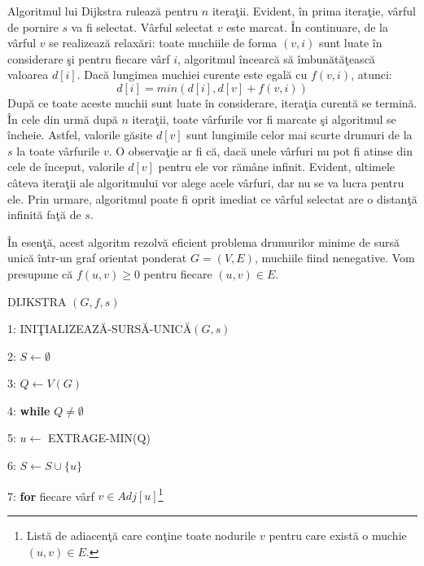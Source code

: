 \documentclass[11pt,a4paper]{report}
\begin{document}
    
    Algoritmul lui Dijkstra ruleaz\u a pentru $n$ itera\c tii. Evident, \^ in  prima itera\c tie, v\^ arful de pornire $s$ va fi selectat. V\^ arful selectat $v$ este marcat. \^ In continuare, de la v\^ arful $v$ se realizeaz\u a relax\u ari: toate muchiile de forma $(v,i)$ sunt luate \^ in considerare \c si pentru fiecare v\^ arf $i$, algoritmul \^ incearc\u a s\u a \^ imbun\u at\u a\c teasc\u a valoarea $d[i]$. Dac\u a lungimea muchiei curente este egal\u a cu $f(v,i)$, atunci:
        \begin{equation*}
    d[i]=min(d[i],d[v]+f(v,i))
    \end{equation*}  
    Dup\u a ce toate aceste muchii sunt luate \^ in considerare, itera\c tia curent\u a se termin\u a. \^ In cele din urm\u a dup\u a $n$ itera\c tii, toate v\^ arfurile vor fi marcate \c si algoritmul se \^ incheie. Astfel, valorile g\u asite $d[v]$ sunt lungimile celor mai scurte drumuri de la $s$ la toate v\^ arfurile $v$.  
    O observa\c tie ar fi c\u a, dac\u a unele v\^ arfuri nu pot fi atinse din cele de \^ inceput, valorile $d[v]$ pentru ele vor r\u am\^ ane infinit. Evident, ultimele c\^ ateva itera\c tii ale algoritmului vor alege acele v\^ arfuri, dar nu se va lucra pentru ele. Prin urmare, algoritmul poate fi oprit imediat ce v\^ arful selectat are o distan\c t\u a infinit\u a fa\c t\u a de $s$. 
    
    \^ In esen\c t\u a, acest algoritm rezolv\u a eficient problema drumurilor minime de surs\u a unic\u a \^ intr-un graf orientat ponderat $G=(V,E)$, muchiile fiind nenegative. Vom presupune c\u a $f(u,v)\ge 0$ pentru fiecare $(u,v)\in E$.
    
    
    \vspace{0.3cm}
    DIJKSTRA $(G,f,s)$
    
    \vspace{0.1cm}
    1: INI\c TIALIZEAZ\u A-SURS\u A-UNIC\u A$(G,s)$
    
    2: $S\longleftarrow \emptyset$  
    
    3: $Q\longleftarrow V(G)$
    
    4: \textbf{while} $Q\ne \emptyset$ 
    
    5:\hspace{0.6cm} $u\longleftarrow$ EXTRAGE-MIN(Q)
    
    6:\hspace{0.6cm} $S\longleftarrow S\cup \{u\}$
    
    7:\hspace{0.6cm} \textbf{for} fiecare v\^ arf $v\in Adj[u]$\footnote{List\u a de adiacen\c t\u a care con\c tine toate nodurile $v$ pentru care exist\u a o muchie $(u,v)\in E$.} 
    
\end{document}
